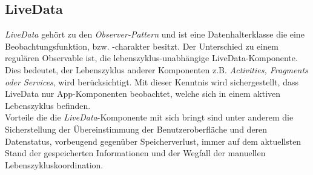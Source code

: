 \subsection*{LiveData}
\label{sec:LiveData}
\textit{LiveData} gehört zu den \textit{Observer-Pattern} und ist eine Datenhalterklasse die eine Beobachtungsfunktion, bzw. -charakter besitzt. Der 
Unterschied zu einem regulären Observable ist, die lebenszyklus-unabhängige LiveData-Komponente. Dies bedeutet, der Lebenszyklus anderer 
Komponenten z.B. \textit{Activities, Fragments oder Services}, wird berücksichtigt. Mit dieser Kenntnis wird sichergestellt, dass LiveData 
nur App-Komponenten beobachtet, welche sich in einem aktiven Lebenszyklus befinden.
\\ 
\linebreak
Vorteile die die \textit{LiveData}-Komponente mit sich bringt sind unter anderem die Sicherstellung der Übereinstimmung der Benutzeroberfläche und 
deren Datenstatus, vorbeugend gegenüber Speicherverlust, immer auf dem aktuellsten Stand der gespeicherten Informationen und der Wegfall 
der manuellen Lebenszykluskoordination. \cite{livedata.2020}
